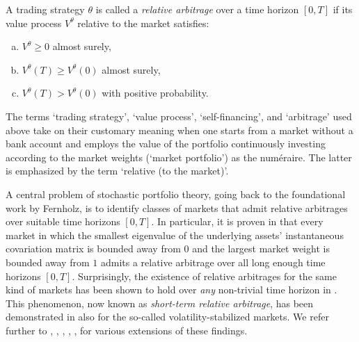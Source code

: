 \documentclass[11pt]{amsart}
\numberwithin{equation}{section}
\begin{document}
\begin{defn}
A trading strategy $\theta$ is called a \textit{relative arbitrage} over a time horizon $[0, T]$ if its value process $V^{\theta}$ relative to the market satisfies:
\begin{enumerate}[(a)]
    \item $V^\theta\ge0$ almost surely, 
 	\item $V^{\theta}(T) \ge V^{\theta}(0)$ almost surely,
    \item $V^{\theta}(T) > V^{\theta}(0) $ with positive probability.
\end{enumerate}
\end{defn}

\smallskip

The terms `trading strategy', `value process', `self-financing', and `arbitrage' used above
take on their customary meaning when one starts from a market without a bank account and employs the value of the portfolio continuously investing according to the market weights (`market portfolio') as the num\'{e}raire. The latter is emphasized by the term `relative (to the market)'. 

\medskip

A central problem of stochastic portfolio theory, going back to the foundational work \cite{fernholz_stochastic_2002} by Fernholz, is to identify classes of markets that admit relative arbitrages over suitable time horizons $[0,T]$. In particular, it is proven in \cite[Example 3.3.3]{fernholz_stochastic_2002} that every market in which the smallest eigenvalue of the underlying assets' instantaneous covariation matrix is bounded away from $0$ and the largest market weight is bounded away from $1$ admits a relative arbitrage over all long enough time horizons $[0,T]$. Surprisingly, the existence of relative arbitrages for the same kind of markets has been shown to hold over \textit{any} non-trivial time horizon in \cite{fernholz_diversity_2005}. This phenomenon, now known as \textit{short-term relative arbitrage}, has been demonstrated in \cite{fernholz_relative_2005} also for the so-called volatility-stabilized markets. We refer further to \cite{KR17}, \cite{vovk18}, \cite{Cu19}, \cite{RX19}, \cite{KK20}, \cite{itkin25} for various extensions of these findings. 

\medskip
\end{document}

